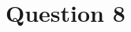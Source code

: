 \documentclass[../CSC_5RO12_TA_TP3.tex]{subfiles}
\begin{document}
\section{Question 8}
\end{document}
